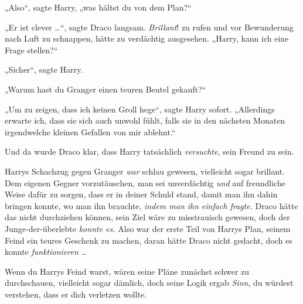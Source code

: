 „Also“, sagte Harry, „was hältst du von dem Plan?“

„Er ist clever …“, sagte Draco langsam. \emph{Brillant}! zu rufen und vor Bewunderung nach Luft zu schnappen, hätte zu verdächtig ausgesehen.
„Harry, kann ich eine Frage stellen?“

„Sicher“, sagte Harry.

„Warum hast du Granger einen teuren Beutel gekauft?“

„Um zu zeigen, dass ich keinen Groll hege“, sagte Harry sofort.
„Allerdings erwarte ich, dass sie sich auch unwohl fühlt, falls sie in den nächsten Monaten irgendwelche kleinen Gefallen von mir ablehnt.“

Und da wurde Draco klar, dass Harry tatsächlich \emph{versuchte}, sein Freund zu sein.

Harrys Schachzug gegen Granger \emph{war} schlau gewesen, vielleicht sogar brillant. Dem eigenen Gegner vorzutäuschen, man sei unverdächtig \emph{und} auf freundliche Weise dafür zu sorgen, dass er in deiner Schuld stand, damit man ihn dahin bringen konnte, wo man ihn brauchte, \emph{indem man ihn} \emph{einfach fragte.} Draco hätte das nicht durchziehen können, sein Ziel wäre zu misstrauisch gewesen, doch der Junge-der-überlebte \emph{konnte es.} Also war der erste Teil von Harrys Plan, seinem Feind ein teures Geschenk zu machen, daran hätte Draco nicht gedacht, doch es konnte \emph{funktionieren …}

Wenn du Harrys Feind warst, wären seine Pläne zunächst schwer zu durchschauen, vielleicht sogar dämlich, doch seine Logik ergab \emph{Sinn}, du würdest verstehen, dass er dich verletzen wollte.

